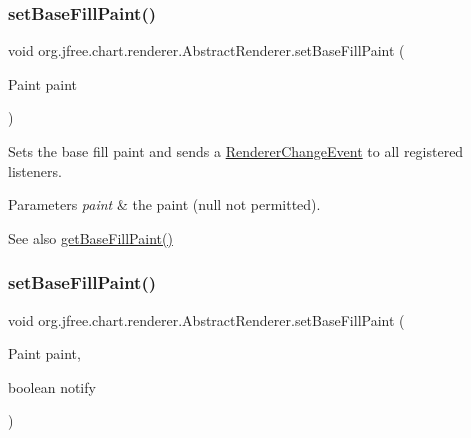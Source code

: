 \subsubsection{\texorpdfstring{set\+Base\+Fill\+Paint()}{setBaseFillPaint()}\hspace{0.1cm}{\footnotesize\ttfamily [1/2]}}
{\footnotesize\ttfamily void org.\+jfree.\+chart.\+renderer.\+Abstract\+Renderer.\+set\+Base\+Fill\+Paint (\begin{DoxyParamCaption}\item[{Paint}]{paint }\end{DoxyParamCaption})}

Sets the base fill paint and sends a \mbox{\hyperlink{}{Renderer\+Change\+Event}} to all registered listeners.


\begin{DoxyParams}{Parameters}
{\em paint} & the paint ({\ttfamily null} not permitted).\\
\hline
\end{DoxyParams}
\begin{DoxySeeAlso}{See also}
\mbox{\hyperlink{classorg_1_1jfree_1_1chart_1_1renderer_1_1_abstract_renderer_a2a4e95f2a4c788c700bf5f14eff1ad01}{get\+Base\+Fill\+Paint()}} 
\end{DoxySeeAlso}
\mbox{\label{classorg_1_1jfree_1_1chart_1_1renderer_1_1_abstract_renderer_a4459e5fa0bd6b01b1c7ba2083c1aa6f4}} 
\subsubsection{\texorpdfstring{set\+Base\+Fill\+Paint()}{setBaseFillPaint()}\hspace{0.1cm}{\footnotesize\ttfamily [2/2]}}
{\footnotesize\ttfamily void org.\+jfree.\+chart.\+renderer.\+Abstract\+Renderer.\+set\+Base\+Fill\+Paint (\begin{DoxyParamCaption}\item[{Paint}]{paint,  }\item[{boolean}]{notify }\end{DoxyParamCaption})}

